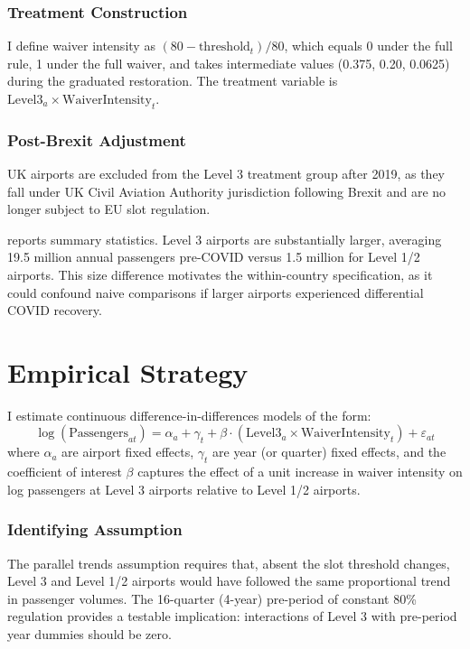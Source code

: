 \documentclass[12pt]{article}
\begin{document}
\subsubsection*{Treatment Construction} I define waiver intensity as $(80 - \text{threshold}_t) / 80$, which equals 0 under the full rule, 1 under the full waiver, and takes intermediate values (0.375, 0.20, 0.0625) during the graduated restoration. The treatment variable is $\text{Level3}_a \times \text{WaiverIntensity}_t$.

\subsubsection*{Post-Brexit Adjustment} UK airports are excluded from the Level 3 treatment group after 2019, as they fall under UK Civil Aviation Authority jurisdiction following Brexit and are no longer subject to EU slot regulation.

 reports summary statistics. Level 3 airports are substantially larger, averaging 19.5 million annual passengers pre-COVID versus 1.5 million for Level 1/2 airports. This size difference motivates the within-country specification, as it could confound naive comparisons if larger airports experienced differential COVID recovery.



\section{Empirical Strategy}

I estimate continuous difference-in-differences models of the form:
\begin{equation}
\log(\text{Passengers}_{at}) = \alpha_a + \gamma_t + \beta \cdot (\text{Level3}_a \times \text{WaiverIntensity}_t) + \varepsilon_{at}
\label{eq:main}
\end{equation}
where $\alpha_a$ are airport fixed effects, $\gamma_t$ are year (or quarter) fixed effects, and the coefficient of interest $\beta$ captures the effect of a unit increase in waiver intensity on log passengers at Level 3 airports relative to Level 1/2 airports.

\subsubsection*{Identifying Assumption} The parallel trends assumption requires that, absent the slot threshold changes, Level 3 and Level 1/2 airports would have followed the same proportional trend in passenger volumes. The 16-quarter (4-year) pre-period of constant 80\% regulation provides a testable implication: interactions of Level 3 with pre-period year dummies should be zero.
\end{document}
